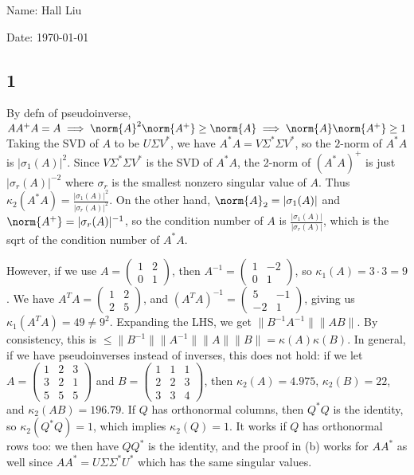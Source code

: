 \documentclass{article}
\newcommand{\openm}{\begin{pmatrix}}
\newcommand{\closem}{\end{pmatrix}}
\begin{document}
Name: Hall Liu

Date: \today 
\vspace{1.5cm}
\subsection*{1}
By defn of pseudoinverse, $AA^+A=A\implies\norm{A}^2\norm{A^+}\geq\norm{A}\implies\norm{A}\norm{A^+}\geq1$
Taking the SVD of $A$ to be $U\Sigma V^*$, we have $A^*A=V\Sigma^*\Sigma V^*$, so the $2$-norm of $A^*A$ is $|\sigma_1(A)|^2$. Since $V\Sigma^*\Sigma V^*$ is the SVD of $A^*A$, the 2-norm of $(A^*A)^+$ is just $|\sigma_r(A)|^{-2}$ where $\sigma_r$ is the smallest nonzero singular value of $A$. Thus $\kappa_2(A^*A)=\frac{|\sigma_1(A)|^2}{|\sigma_r(A)|^2}$. On the other hand, $\norm{A}_2=|\sigma_1(A)|$ and $\norm{A^+}=|\sigma_r(A)|^{-1}$, so the condition number of $A$ is $\frac{|\sigma_1(A)|}{|\sigma_r(A)|}$, which is the sqrt of the condition number of $A^*A$.


However, if we use $A=\openm1&2\\0&1\closem$, then $A^{-1}=\openm1&-2\\0&1\closem$, so $\kappa_1(A)=3\cdot3=9$. We have $A^TA=\openm1&2\\2&5\closem$, and $(A^TA)^{-1}=\openm5&-1\\-2&1\closem$, giving us $\kappa_1(A^TA)=49\neq9^2$.
Expanding the LHS, we get $\|B^{-1}A^{-1}\|\|AB\|$. By consistency, this is $\leq\|B^{-1}\|\|A^{-1}\|\|A\|\|B\|=\kappa(A)\kappa(B)$. In general, if we have pseudoinverses instead of inverses, this does not hold: if we let $A=\openm1&2&3\\3&2&1\\5&5&5\closem$ and $B=\openm1&1&1\\2&2&3\\3&3&4\closem$, then $\kappa_2(A)=4.975$, $\kappa_2(B)=22$, and $\kappa_2(AB)=196.79$.
If $Q$ has orthonormal columns, then $Q^*Q$ is the identity, so $\kappa_2(Q^*Q)=1$, which implies $\kappa_2(Q)=1$. It works if $Q$ has orthonormal rows too: we then have $QQ^*$ is the identity, and the proof in (b) works for $AA^*$ as well since $AA^*=U\Sigma\Sigma^*U^*$ which has the same singular values. 
\end{document}
